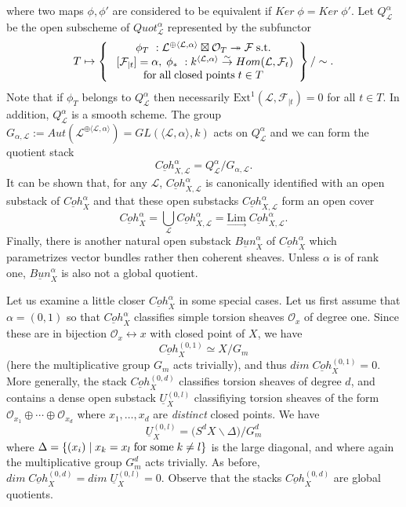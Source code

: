\documentclass[a4paper,10pt]{amsart}
\def\tto{\twoheadrightarrow}
\def\a{\alpha}
\numberwithin{equation}{section}
\begin{document}
where two maps $\phi,\phi'$ are considered to be equivalent if $Ker\;\phi=Ker\;\phi'$. Let $Q_{\mathcal{L}}^{\a}$ be the open subscheme of $Quot^{\a}_{\mathcal{L}}$ represented by the subfunctor
$$T \mapsto \left\{ 
\begin{array}{c}
\phi_T~:\mathcal{L}^{\oplus \langle \mathcal{L},\a\rangle}\boxtimes \mathcal{O}_T \tto \mathcal{F}\;\text{s.t.}\\ \;[\mathcal{F}_{|t}]=\alpha,\;
\phi_*~:k^{\langle \mathcal{L},\a\rangle} \stackrel{\sim}{\to} Hom(\mathcal{L},\mathcal{F}_{t})\\
\text{for\;all\;closed\;points\;}t \in T
\end{array}\right\}\huge{/}\sim.$$
Note that if $\phi_T$ belongs to $Q^{\a}_{\mathcal{L}}$ then necessarily $\text{Ext}^1(\mathcal{L},\mathcal{F}_{|t})=0$ for all $t \in T$. In addition, $Q^{\a}_{\mathcal{L}}$ is a smooth scheme. The group $G_{\a,\mathcal{L}}:=Aut(\mathcal{L}^{\oplus \langle \mathcal{L},\a\rangle})=GL(\langle \mathcal{L},\a\rangle,k)$ acts on $Q^{\a}_{\mathcal{L}}$ and we can form the quotient stack
$$\underline{Coh}^{\a}_{X,\mathcal{L}}=Q^{\a}_{\mathcal{L}}/G_{\a,\mathcal{L}}.$$
It can be shown that, for any $\mathcal{L}$, $\underline{Coh}^{\a}_{X,\mathcal{L}}$ is canonically identified with an open substack of $\underline{Coh}_{X}^{\a}$ and that these open substacks $\underline{Coh}^{\a}_{X,\mathcal{L}}$ form an open cover
$$\underline{Coh}_{X}^{\a}=\bigcup_{\mathcal{L}} \underline{Coh}^{\a}_{X,\mathcal{L}}=\underset{\longrightarrow}{\text{Lim}}\; \underline{Coh}^{\a}_{X,\mathcal{L}}.$$
Finally, there is another natural open substack $\underline{Bun}^{\a}_X$ of $\underline{Coh}^{\a}_{X}$ which parametrizes vector bundles rather then coherent sheaves. Unless $\a$ is of rank one, $\underline{Bun}^{\a}_{X}$ is also not a global quotient.

\vspace{.1in}

Let us examine a little closer $\underline{Coh}^{\a}_{X}$ in some special cases. Let us first assume that $\a=(0,1)$ so that $\underline{Coh}^{\a}_X$ classifies simple torsion sheaves $\mathcal{O}_x$ of degree one. Since these are in bijection $\mathcal{O}_x \leftrightarrow x$ with closed point of $X$, we have
$$\underline{Coh}^{(0,1)}_{X} \simeq X/G_m$$
(here the multiplicative group $G_m$ acts trivially), and thus $dim\;\underline{Coh}^{(0,1)}_{X}=0$. More generally, the stack $\underline{Coh}^{(0,d)}_X$ classifies torsion sheaves of degree $d$, and contains a dense open substack $\underline{U}^{(0,l)}_X$ classifiying torsion sheaves of the form $\mathcal{O}_{x_1} \oplus \cdots \oplus \mathcal{O}_{x_d}$ where $x_1, \ldots, x_d$ are \textit{distinct} closed points. We have
$$\underline{U}^{(0,l)}_X=\big(S^dX \backslash \Delta\big)/G_m^d$$
where $\Delta=\{(x_i)\;|\; x_k=x_l\;\text{for\;some\;}k \neq l\}$ is the large diagonal, and where again the multiplicative group $G_m^d$ acts trivially. As before, $dim\;\underline{Coh}^{(0,d)}_{X}=dim\;\underline{U}^{(0,l)}_X=0$. Observe that the stacks $\underline{Coh}^{(0,d)}_X$ are global quotients.
\end{document}

